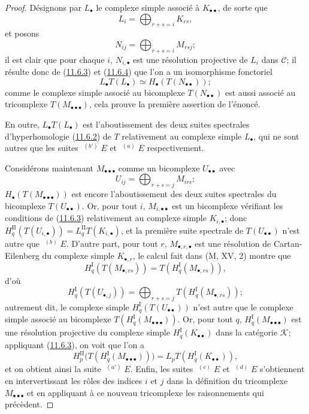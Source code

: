 \begin{proof}
Désignons par $L_\bullet$ le complexe simple associé à
$K_{\bullet\bullet}$, de sorte que
\[
L_i=\bigoplus_{r+s=i}K_{rs},
\]
et posons
\[
N_{ij}=\bigoplus_{r+s=i}M_{rsj};
\]
il est clair que pour chaque $i$, $N_{i,\bullet}$ est une résolution
projective de $L_i$ dans $\mathcal C$; il résulte donc de
(\hyperref[0.11.6.3-fr]{11.6.3}) et
(\hyperref[0.11.6.4-fr]{11.6.4}) que l'on a un isomorphisme fonctoriel
\[
L_\bullet T(L_\bullet)\simeq H_\bullet(T(N_{\bullet\bullet}));
\]
comme le complexe simple associé au bicomplexe $T(N_{\bullet\bullet})$ est
aussi associé au tricomplexe $T(M_{\bullet\bullet\bullet})$, cela prouve la
première assertion de l'énoncé.

En outre, $L_\bullet T(L_\bullet)$ est l'aboutissement des deux suites
spectrales d'hyperhomologie (\hyperref[0.11.6.2-fr]{11.6.2}) de $T$
relativement au complexe simple $L_\bullet$, qui ne sont autres que les suites
$\mathop{}^{(b')}E$ et $\mathop{}^{(a)}E$ respectivement.

Considérons maintenant $M_{\bullet\bullet\bullet}$ comme un bicomplexe
$U_{\bullet\bullet}$ avec
\[
U_{ij}=\bigoplus_{r+s=j}M_{irs};
\]
$H_\bullet(T(M_{\bullet\bullet\bullet}))$ est encore l'aboutissement des deux
suites spectrales du bicomplexe $T(U_{\bullet\bullet})$. Or, pour tout $i$,
$M_{i,\bullet\bullet}$ est un bicomplexe vérifiant les conditions de
(\hyperref[0.11.6.3-fr]{11.6.3}) relativement au complexe simple
$K_{i,\bullet}$; donc
$H_q^{\mathrm{II}}(T(U_{i,\bullet}))=
L_q^{\mathrm{II}}T(K_{i,\bullet})$, et la première suite spectrale de
$T(U_{\bullet\bullet})$ n'est autre que $\mathop{}^{(b)}E$. D'autre part, pour
tout $r$, $M_{\bullet,r,\bullet}$ est une résolution de Cartan-Eilenberg du
complexe simple $K_{\bullet,r}$, le calcul fait dans (M, XV, 2) montre que
\[
H_q^{\mathrm I}(T(M_{\bullet,rs}))
=T(H_q^{\mathrm I}(M_{\bullet,rs})),
\]
d'où
\[
H_q^{\mathrm I}(T(U_{\bullet,j}))
=\bigoplus_{r+s=j}T(H_q^{\mathrm I}(M_{\bullet,rs}));
\]
autrement dit, le complexe simple
$H_q^{\mathrm I}(T(U_{\bullet\bullet}))$ n'est autre que le complexe simple
associé au bicomplexe
$T(H_q^{\mathrm I}(M_{\bullet\bullet\bullet}))$. Or, pour tout $q$,
$H_q^{\mathrm I}(M_{\bullet\bullet\bullet})$ est une résolution projective du
complexe simple $H_q^{\mathrm I}(K_{\bullet\bullet})$ dans la catégorie
$\mathcal K$; appliquant (\hyperref[0.11.6.3-fr]{11.6.3}), on voit que l'on a
\[
H_p^{\mathrm{II}}
\bigl(T(H_q^{\mathrm I}(M_{\bullet\bullet\bullet}))\bigr)
=L_pT(H_q^{\mathrm I}(K_{\bullet\bullet})),
\]
et on obtient ainsi la suite $\mathop{}^{(a')}E$. Enfin, les suites
$\mathop{}^{(c)}E$ et $\mathop{}^{(d)}E$ s'obtiennent en intervertissant les
rôles des indices $i$ et $j$ dans la définition du tricomplexe
$M_{\bullet\bullet\bullet}$ et en appliquant à ce nouveau tricomplexe les
raisonnements qui précèdent.
\end{proof}


